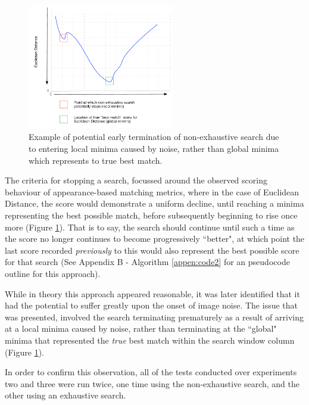 \begin{figure}
\vspace{-20pt}
  \begin{center}
    \includegraphics[width=0.57\textwidth]{images/ed.pdf}
  \end{center}
  \vspace{-10pt}
  \caption{Example of potential early termination of non-exhaustive search due to entering local minima caused by noise, rather than global minima which represents to true best match.}
     \label{fig:ed}
  \vspace{-10pt}
\end{figure}

The criteria for stopping a search, focussed around the observed scoring behaviour of appearance-based matching metrics, where in the case of Euclidean Distance, the score would demonstrate a uniform decline, until reaching a minima representing the best possible match, before subsequently beginning to rise once more (Figure \ref{fig:ed}). That is to say, the search should continue until such a time as the score no longer continues to become progressively ``better", at which point the last score recorded \textit{previously} to this would also represent the best possible score for that search (See Appendix B - Algorithm \ref{appen:code2} for an pseudocode outline for this approach).

While in theory this approach appeared reasonable, it was later identified that it had the potential to suffer greatly upon the onset of image noise. The issue that was presented, involved the search terminating prematurely as a result of arriving at a local minima caused by noise, rather than terminating at the ``global" minima that represented the \textit{true} best match within the search window column (Figure \ref{fig:ed}). 

In order to confirm this observation, all of the tests conducted over experiments two and three were run twice, one time using the non-exhaustive search, and the other using an exhaustive search.

